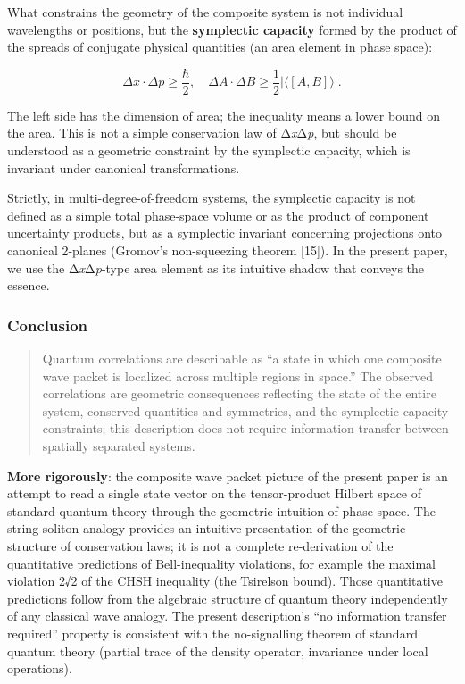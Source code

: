 \documentclass[
  11pt,
]{article}
\begin{document}
What constrains the geometry of the composite system is not individual
wavelengths or positions, but the \textbf{symplectic capacity} formed by
the product of the spreads of conjugate physical quantities (an area
element in phase space):

\[\Delta x \cdot \Delta p \geq \frac{\hbar}{2}, \quad \Delta A \cdot \Delta B \geq \frac{1}{2}\left|\langle [A,B] \rangle\right|.\]

The left side has the dimension of area; the inequality means a lower
bound on the area. This is not a simple conservation law of
Δ\emph{x}Δ\emph{p}, but should be understood as a geometric constraint
by the symplectic capacity, which is invariant under canonical
transformations.

Strictly, in multi-degree-of-freedom systems, the symplectic capacity is
not defined as a simple total phase-space volume or as the product of
component uncertainty products, but as a symplectic invariant concerning
projections onto canonical 2-planes (Gromov's non-squeezing theorem
{[}15{]}). In the present paper, we use the Δ\emph{x}Δ\emph{p}-type area
element as its intuitive shadow that conveys the essence.

\subsubsection{Conclusion}\label{conclusion-3}

\begin{quote}
Quantum correlations are describable as ``a state in which one composite
wave packet is localized across multiple regions in space.'' The
observed correlations are geometric consequences reflecting the state of
the entire system, conserved quantities and symmetries, and the
symplectic-capacity constraints; this description does not require
information transfer between spatially separated systems.
\end{quote}

\textbf{More rigorously}: the composite wave packet picture of the
present paper is an attempt to read a single state vector on the
tensor-product Hilbert space of standard quantum theory through the
geometric intuition of phase space. The string-soliton analogy provides
an intuitive presentation of the geometric structure of conservation
laws; it is not a complete re-derivation of the quantitative predictions
of Bell-inequality violations, for example the maximal violation 2√2 of
the CHSH inequality (the Tsirelson bound). Those quantitative
predictions follow from the algebraic structure of quantum theory
independently of any classical wave analogy. The present description's
``no information transfer required'' property is consistent with the
no-signalling theorem of standard quantum theory (partial trace of the
density operator, invariance under local operations).
\end{document}
